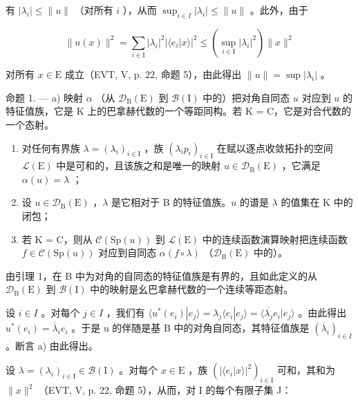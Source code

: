 有 \(|\lambda_i| \leqslant \|u\|\) （对所有 \(i\) ），从而 \(\sup_{i \in I} |\lambda_i| \leqslant \|u\|\) 。此外，由于

\[
\| u (x) \| ^ {2} = \sum_ {i \in \mathrm{I}} | \lambda_ {i} | ^ {2} | \langle e _ {i} | x \rangle | ^ {2} \leqslant \left(\sup _ {i \in \mathrm{I}} | \lambda_ {i} | ^ {2}\right) \| x \| ^ {2}
\]

对所有 \(x \in \mathrm{E}\) 成立（EVT, V, p. 22, 命题 5），由此得出 \(\| u\| = \sup |\lambda_i|\) 。

命题 1. --- a) 映射 \(\alpha\) （从 \(\mathcal{D}_{\mathrm{B}}(\mathrm{E})\) 到 \(\mathcal{B}(\mathrm{I})\) 中的）把对角自同态 \(u\) 对应到 \(u\) 的特征值族，它是 K 上的巴拿赫代数的一个等距同构。若 K = C，它是对合代数的一个态射。

\begin{enumerate}
\def\labelenumi{\alph{enumi})}
\setcounter{enumi}{1}
\item
  对任何有界族 \(\lambda = (\lambda_i)_{i\in \mathrm{I}}\) ，族 \((\lambda_ip_i)_{i\in \mathrm{I}}\) 在赋以逐点收敛拓扑的空间 \(\mathcal{L}(\mathrm{E})\) 中是可和的，且该族之和是唯一的映射 \(u\in \mathcal{D}_{\mathrm{B}}(\mathrm{E})\) ，它满足 \(\alpha (u) = \lambda\) ；
\item
  设 \(u \in \mathcal{D}_{\mathrm{B}}(\mathrm{E})\) ，\(\lambda\) 是它相对于 B 的特征值族。\(u\) 的谱是 \(\lambda\) 的值集在 K 中的闭包；
\item
  若 K = C，则从 \(\mathcal{C}(\mathrm{Sp}(u))\) 到 \(\mathcal{L}(\mathrm{E})\) 中的连续函数演算映射把连续函数 \(f \in \mathcal{C}(\mathrm{Sp}(u))\) 对应到自同态 \(\alpha(f \circ \lambda)\) （\(\mathcal{D}_{\mathrm{B}}(\mathrm{E})\) 中的）。
\end{enumerate}

由引理 1，在 B 中为对角的自同态的特征值族是有界的，且如此定义的从 \(\mathcal{D}_{\mathrm{B}}(\mathrm{E})\) 到 \(\mathcal{B}(\mathrm{I})\) 中的映射是幺巴拿赫代数的一个连续等距态射。

设 \(i \in I\) 。对每个 \(j \in I\) ，我们有 \(\langle u^{*}(e_{i}) | e_{j} \rangle = \lambda_{j} \langle e_{i} | e_{j} \rangle = \langle \overline{\lambda_{j}} e_{i} | e_{j} \rangle\) 。由此得出 \(u^{*}(e_{i}) = \overline{\lambda}_{i} e_{i}\) 。于是 u 的伴随是基 B 中的对角自同态，其特征值族是 \((\overline{\lambda}_{i})_{i \in I}\) 。断言 a) 由此得出。

设 \(\lambda = (\lambda_i)_{i\in \mathrm{I}}\in \mathcal{B}(\mathrm{I})\) 。对每个 \(x\in \mathrm{E}\) ，族 \((|\langle e_i|x\rangle |^2)_{i\in \mathrm{I}}\) 可和，其和为 \(\| x\|^2\) （EVT, V, p. 22, 命题 5），从而，对 I 的每个有限子集 J：

